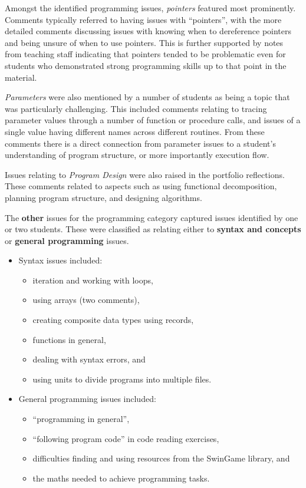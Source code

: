 Amongst the identified programming issues, \emph{pointers} featured most prominently. Comments typically referred to having issues with ``pointers'', with the more detailed comments discussing issues with knowing when to dereference pointers and being unsure of when to use pointers. This is further supported by notes from teaching staff indicating that pointers tended to be problematic even for students who demonstrated strong programming skills up to that point in the material.

\emph{Parameters} were also mentioned by a number of students as being a topic that was particularly challenging. This included comments relating to tracing parameter values through a number of function or procedure calls, and issues of a single value having different names across different routines. From these comments there is a direct connection from parameter issues to a student's understanding of program structure, or more importantly execution flow.

Issues relating to \emph{Program Design} were also raised in the portfolio reflections. These comments related to aspects such as using functional decomposition, planning program structure, and designing algorithms.

The \textbf{other} issues for the programming category captured issues identified by one or two students. These were classified as relating either to \textbf{syntax and concepts} or \textbf{general programming} issues.

\begin{itemize}[noitemsep,nolistsep]
  \item Syntax issues included:
  \begin{itemize}[noitemsep,nolistsep]
    \item iteration and working with loops,
    \item using arrays (two comments),
    \item creating composite data types using records,
    \item functions in general,
    \item dealing with syntax errors, and 
    \item using units to divide programs into multiple files.
  \end{itemize}
  \item General programming issues included:
  \begin{itemize}[noitemsep,nolistsep]
    \item ``programming in general'',
    \item ``following program code'' in code reading exercises,
    \item difficulties finding and using resources from the SwinGame library, and
    \item the maths needed to achieve programming tasks.
  \end{itemize}
\end{itemize}

